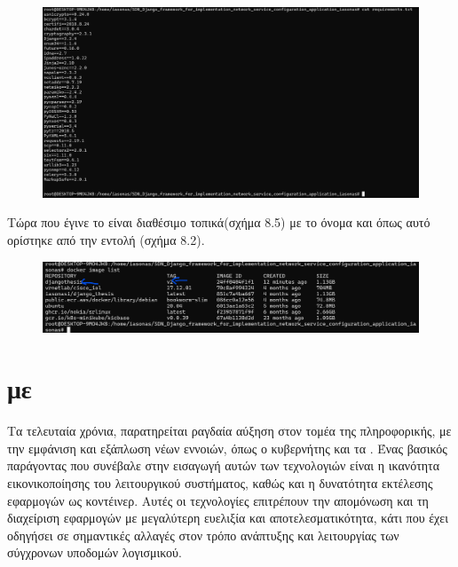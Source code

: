 \FloatBarrier

\FloatBarrier

\begin{figure}[h]
	\centering
	\includegraphics[width=1.0\textwidth]{graphics/requirements.png}
	\caption{}
\end{figure}

\FloatBarrier

\noindent Τώρα που έγινε  το  είναι διαθέσιμο τοπικά(σχήμα 8.5) με το όνομα  και  όπως αυτό ορίστηκε από την εντολή (σχήμα 8.2).

\FloatBarrier


\begin{figure}[h]
	\centering
	\includegraphics[width=1.0\textwidth]{graphics/docker_image_list_2.png}
	\caption{}
\end{figure}

\FloatBarrier



\section{ με }

Τα τελευταία χρόνια, παρατηρείται ραγδαία αύξηση στον τομέα της πληροφορικής, 
με την εμφάνιση και εξάπλωση νέων εννοιών, όπως ο κυβερνήτης και τα . 
Ένας βασικός παράγοντας που συνέβαλε στην εισαγωγή αυτών των τεχνολογιών είναι η ικανότητα εικονικοποίησης 
του λειτουργικού συστήματος, καθώς και η δυνατότητα εκτέλεσης εφαρμογών ως κοντέινερ. 
Αυτές οι τεχνολογίες επιτρέπουν την απομόνωση και τη διαχείριση εφαρμογών με μεγαλύτερη ευελιξία και 
αποτελεσματικότητα, κάτι που έχει οδηγήσει σε σημαντικές αλλαγές στον τρόπο ανάπτυξης και λειτουργίας των σύγχρονων υποδομών λογισμικού.


